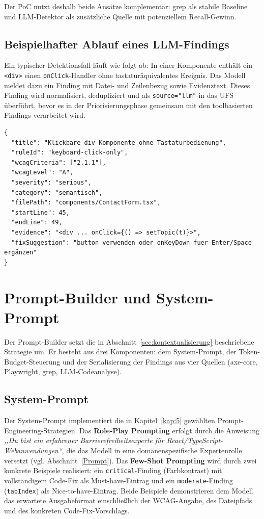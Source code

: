 Der \ac{PoC} nutzt deshalb beide Ansätze komplementär: grep als stabile Baseline und LLM-Detektor als zusätzliche Quelle mit potenziellem Recall-Gewinn.

\subsection{Beispielhafter Ablauf eines LLM-Findings}

Ein typischer Detektionsfall läuft wie folgt ab: In einer Komponente enthält ein \texttt{<div>} einen \texttt{onClick}-Handler ohne tastaturäquivalentes Ereignis. Das Modell meldet dazu ein Finding mit Datei- und Zeilenbezug sowie Evidenztext. Dieses Finding wird normalisiert, dedupliziert und als \texttt{source="llm"} in das \ac{UFS} überführt, bevor es in der Priorisierungsphase gemeinsam mit den toolbasierten Findings verarbeitet wird.

\begin{lstlisting}[language={}, caption={Beispiel eines validierten LLM-Detektor-Findings (vereinfacht)}]
{
  "title": "Klickbare div-Komponente ohne Tastaturbedienung",
  "ruleId": "keyboard-click-only",
  "wcagCriteria": ["2.1.1"],
  "wcagLevel": "A",
  "severity": "serious",
  "category": "semantisch",
  "filePath": "components/ContactForm.tsx",
  "startLine": 45,
  "endLine": 49,
  "evidence": "<div ... onClick={() => setTopic(t)}>",
  "fixSuggestion": "button verwenden oder onKeyDown fuer Enter/Space ergänzen"
}
\end{lstlisting}

\section{Prompt-Builder und System-Prompt}
\label{sec:impl-prompt}

Der Prompt-Builder setzt die in Abschnitt~\ref{sec:kontextualisierung} beschriebene Strategie um. Er besteht aus drei Komponenten: dem System-Prompt, der Token-Budget-Steuerung und der Serialisierung der Findings aus vier Quellen (axe-core, Playwright, grep, LLM-Codeanalyse).

\subsection{System-Prompt}

Der System-Prompt implementiert die in Kapitel~\ref{kap:5} gewählten Prompt-Engineering-Strategien. Das \textbf{Role-Play Prompting} erfolgt durch die Anweisung \emph{,,Du bist ein erfahrener Barrierefreiheitsexperte für React/TypeScript-Webanwendungen``}, die das Modell in eine domänenspezifische Expertenrolle versetzt (vgl. Abschnitt~\ref{Prompt}). Das \textbf{Few-Shot Prompting} wird durch zwei konkrete Beispiele realisiert: ein \texttt{critical}-Finding (Farbkontrast) mit vollständigem Code-Fix als Must-have-Eintrag und ein \texttt{moderate}-Finding (\texttt{tabIndex}) als Nice-to-have-Eintrag. Beide Beispiele demonstrieren dem Modell das erwartete Ausgabeformat einschließlich der \ac{WCAG}-Angabe, des Dateipfads und des konkreten Code-Fix-Vorschlags.

